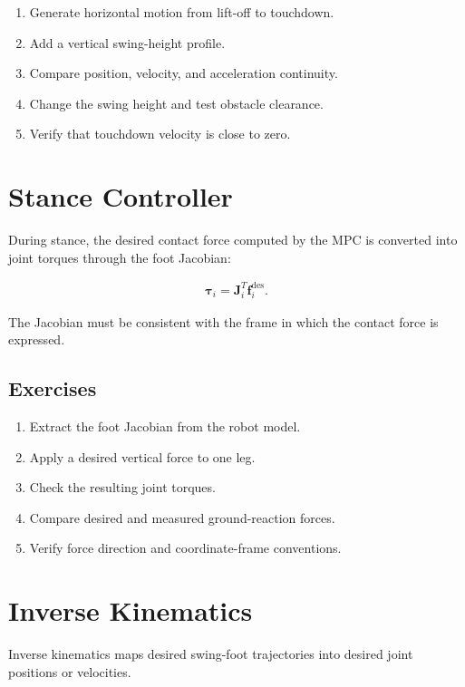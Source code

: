 \documentclass[11pt,a4paper]{article}
\begin{document}
\begin{enumerate}[label=\arabic*.]
    \item Generate horizontal motion from lift-off to touchdown.
    \item Add a vertical swing-height profile.
    \item Compare position, velocity, and acceleration continuity.
    \item Change the swing height and test obstacle clearance.
    \item Verify that touchdown velocity is close to zero.
\end{enumerate}

\section{Stance Controller}

During stance, the desired contact force computed by the MPC is converted into joint torques through the foot Jacobian:

\begin{align*}
\bm{\tau}_i = \bm{J}_i^T \bm{f}_i^{\mathrm{des}}.
\end{align*}

The Jacobian must be consistent with the frame in which the contact force is expressed.

\subsection*{Exercises}

\begin{enumerate}[label=\arabic*.]
    \item Extract the foot Jacobian from the robot model.
    \item Apply a desired vertical force to one leg.
    \item Check the resulting joint torques.
    \item Compare desired and measured ground-reaction forces.
    \item Verify force direction and coordinate-frame conventions.
\end{enumerate}

\section{Inverse Kinematics}

Inverse kinematics maps desired swing-foot trajectories into desired joint positions or velocities.
\end{document}
